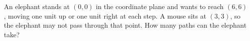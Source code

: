 An elephant stands at $(0,0)$ in the coordinate plane and wants to reach $(6,6)$, moving one unit up or one unit right at each step. A mouse sits at $(3,3)$, so the elephant may not pass through that point. How many paths can the elephant take?
